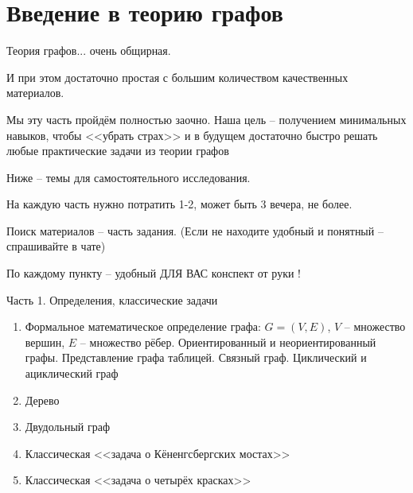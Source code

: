 


\section{Введение в теорию графов}\label{section:graph}

\begin{frame}
Теория графов... 
очень общирная. 

И при этом достаточно простая 
с большим количеством 
качественных материалов.

Мы эту часть пройдём полностью заочно.
Наша цель -- получением минимальных навыков, чтобы 
<<убрать страх>> 
и в будущем достаточно быстро решать любые практические задачи из теории графов

Ниже -- темы для самостоятельного исследования.

На каждую часть нужно потратить 1-2, может быть 3 вечера, не более. 

Поиск материалов -- часть задания. 
(Если не находите удобный и понятный -- спрашивайте в чате)

По каждому пункту -- удобный ДЛЯ ВАС конспект от руки !


\end{frame}

\begin{frame}{Часть 1. Определения, классические задачи}
	
\begin{enumerate}
 \item Формальное математическое определение графа: $G=(V, E)$, $V$ -- множество вершин, $E$ -- множество рёбер.
 Ориентированный и неориентированный графы. Представление графа таблицей. Связный граф. Циклический и ациклический граф
 \item Дерево
 \item Двудольный граф
 \item Классическая <<задача о Кёненгсбергских мостах>>
 \item Классическая <<задача о четырёх красках>>
\end{enumerate}


\end{frame}

